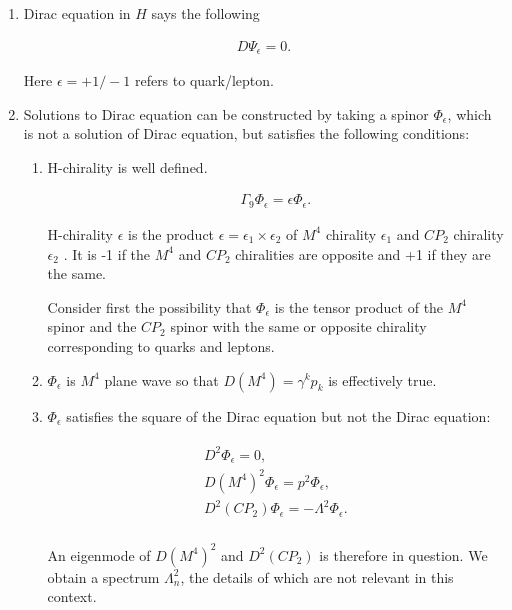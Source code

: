 \documentclass[10pt,epsf]{article}
\begin{document}
\begin{enumerate}

\item Dirac equation in $H$ says the following

\begin{eqnarray}
D\Psi_{\epsilon}=0 .
\end{eqnarray}


\noindent Here $\epsilon =+1/-1$ refers to quark/lepton.

\item Solutions to Dirac equation can be constructed by taking a spinor $\Phi_{\epsilon}$, which is not a solution of Dirac equation, but satisfies the following conditions:

\begin{enumerate}

\item H-chirality is well defined.

\begin{eqnarray}
\Gamma_9\Phi_{\epsilon}= \epsilon \Phi_{\epsilon} .
\end{eqnarray}

\noindent H-chirality $\epsilon$ is the product  $\epsilon=\epsilon_1\times \epsilon_2$ of $M^4$ chirality $\epsilon_1$ and $CP_2$ chirality $\epsilon_2$ . It is -1 if the $M^4$ and $CP_2$ chiralities are opposite and +1 if they are the same.

Consider first the possibility that $\Phi_{\epsilon}$ is the tensor product of the $M^4$ spinor and the $CP_2$ spinor with the same or opposite chirality corresponding to quarks and leptons.

\item $\Phi_{\epsilon}$ is $M^4$  plane wave so that   $D(M^4) =\gamma^kp_k$ is effectively true.

\item $\Phi_{\epsilon}$ satisfies the square of the Dirac equation but not the Dirac equation:

\begin{eqnarray}
\begin{array}{l} D^2\Phi_{\epsilon}=0 ,\\ D(M^4)^2\Phi_{\epsilon}=p^2\Phi_{\epsilon} ,\\ D^2(CP_2)\Phi_{\epsilon}= -\Lambda^2 \Phi_{\epsilon} .\\ \end{array} \end{eqnarray}


\noindent An  eigenmode of $D(M^4)^2$ and $D^2(CP_2)$ is therefore in question. We obtain a spectrum $\Lambda_n^2$, the details of which are not relevant in this context.


\end{enumerate}
\end{enumerate}
\end{document}
